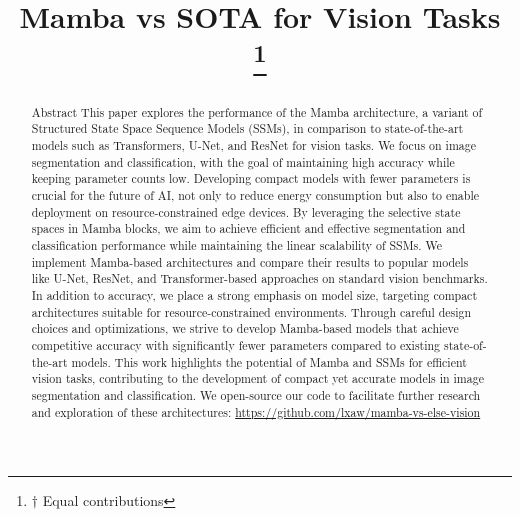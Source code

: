 \documentclass[conference]{IEEEtran}
\begin{document}
\title{Mamba vs SOTA for Vision Tasks\\
    \thanks{$\dagger$ Equal contributions}
}

\author{
    \and
}

\maketitle

\begin{abstract}
    Abstract
    This paper explores the performance of the Mamba architecture, a variant of Structured State Space Sequence Models (SSMs), in comparison to state-of-the-art models such as Transformers, U-Net, and ResNet for vision tasks. We focus on image segmentation and classification, with the goal of maintaining high accuracy while keeping parameter counts low. Developing compact models with fewer parameters is crucial for the future of AI, not only to reduce energy consumption but also to enable deployment on resource-constrained edge devices.
    By leveraging the selective state spaces in Mamba blocks, we aim to achieve efficient and effective segmentation and classification performance while maintaining the linear scalability of SSMs. We implement Mamba-based architectures and compare their results to popular models like U-Net, ResNet, and Transformer-based approaches on standard vision benchmarks.
    In addition to accuracy, we place a strong emphasis on model size, targeting compact architectures suitable for resource-constrained environments. Through careful design choices and optimizations, we strive to develop Mamba-based models that achieve competitive accuracy with significantly fewer parameters compared to existing state-of-the-art models.
    This work highlights the potential of Mamba and SSMs for efficient vision tasks, contributing to the development of compact yet accurate models in image segmentation and classification. We open-source our code to facilitate further research and exploration of these architectures: \href{https://github.com/lxaw/mamba-vs-else-vision}{https://github.com/lxaw/mamba-vs-else-vision}
\end{abstract}
\end{document}
